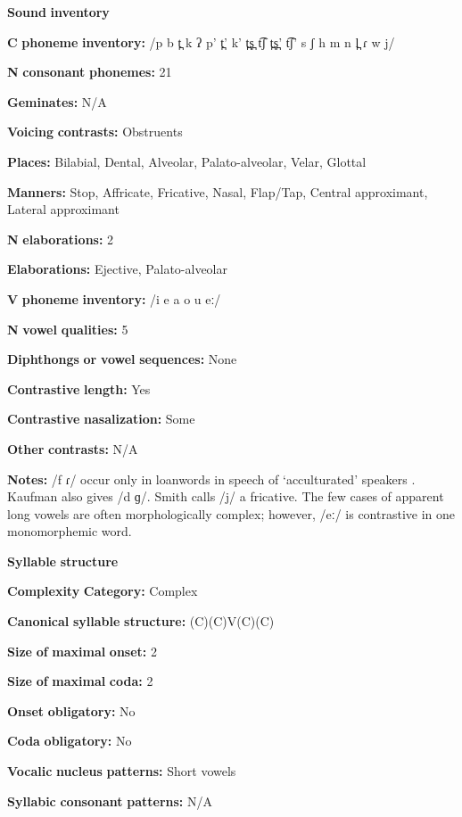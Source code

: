 \textbf{Sound} \textbf{inventory}

\textbf{C} \textbf{phoneme} \textbf{inventory:} /p b t̪ k ʔ p’ t̪’ k’ t̪s̪ t͡ʃ t̪s̪’ t͡ʃ’ s ʃ h m n l̪ ɾ w j/

\textbf{N} \textbf{consonant} \textbf{phonemes:} 21

\textbf{Geminates:} N/A

\textbf{Voicing} \textbf{contrasts:} Obstruents

\textbf{Places:} Bilabial, Dental, Alveolar, Palato-alveolar, Velar, Glottal

\textbf{Manners:} Stop, Affricate, Fricative, Nasal, Flap/Tap, Central approximant, Lateral approximant

\textbf{N} \textbf{elaborations:} 2

\textbf{Elaborations:} Ejective, Palato-alveolar

\textbf{V} \textbf{phoneme} \textbf{inventory:} /i e a o u eː/

\textbf{N} \textbf{vowel} \textbf{qualities:} 5

\textbf{Diphthongs} \textbf{or} \textbf{vowel} \textbf{sequences:} None

\textbf{Contrastive} \textbf{length:} Yes

\textbf{Contrastive} \textbf{nasalization:} Some

\textbf{Other} \textbf{contrasts:} N/A

\textbf{Notes:} /f ɾ/ occur only in loanwords in speech of ‘acculturated’ speakers \citep[13]{Kaufman1971}. Kaufman also gives /d ɡ/. Smith calls /j/ a fricative. The few cases of apparent long vowels are often morphologically complex; however, /eː/ is contrastive in one monomorphemic word.

\textbf{Syllable} \textbf{structure}

\textbf{Complexity} \textbf{Category:} Complex

\textbf{Canonical} \textbf{syllable} \textbf{structure:} (C)(C)V(C)(C) \citep[9-15]{Kaufman1971}

\textbf{Size} \textbf{of} \textbf{maximal} \textbf{onset:} 2

\textbf{Size} \textbf{of} \textbf{maximal} \textbf{coda:} 2

\textbf{Onset} \textbf{obligatory:} No

\textbf{Coda} \textbf{obligatory:} No

\textbf{Vocalic} \textbf{nucleus} \textbf{patterns:} Short vowels

\textbf{Syllabic} \textbf{consonant} \textbf{patterns:} N/A

